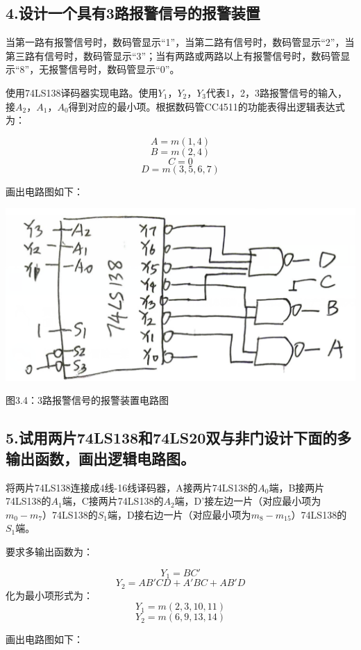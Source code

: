 \documentclass{ctexart}
\begin{document}
\newpage
\subsection*{4.设计一个具有3路报警信号的报警装置}
当第一路有报警信号时，数码管显示“1”，当第二路有信号时，数码管显示“2”，当第三路有信号时，数码管显示“3”；当有两路或两路以上有报警信号时，数码管显示“8”，无报警信号时，数码管显示“0”。

使用74LS138译码器实现电路。使用$Y_1$，$Y_2$，$Y_3$代表1，2，3路报警信号的输入，接$A_2$，$A_1$，$A_0$得到对应的最小项。根据数码管CC4511的功能表得出逻辑表达式为：

$$A=m(1,4)$$
$$B=m(2,4)$$
$$C=0$$
$$D=m(3,5,6,7)$$

画出电路图如下：

    \begin{minipage}[l]{\textwidth}
        \centering 
        \includegraphics[width=\linewidth]{3.4.png} 
        
        图3.4：3路报警信号的报警装置电路图
    \end{minipage}

\subsection*{5.试用两片74LS138和74LS20双与非门设计下面的多输出函数，画出逻辑电路图。}

将两片74LS138连接成4线-16线译码器，A接两片74LS138的$A_0$端，B接两片74LS138的$A_1$端，C接两片74LS138的$A_2$端，D'接左边一片（对应最小项为$m_0-m_7$）74LS138的$S_1$端，D接右边一片（对应最小项为$m_8-m_15$）74LS138的$S_1$端。

要求多输出函数为：

$$Y_1=BC'$$
$$Y_2=AB'CD+A'BC+AB'D$$
化为最小项形式为：
$$Y_1=m(2,3,10,11)$$
$$Y_2=m(6,9,13,14)$$

画出电路图如下：
\end{document}
